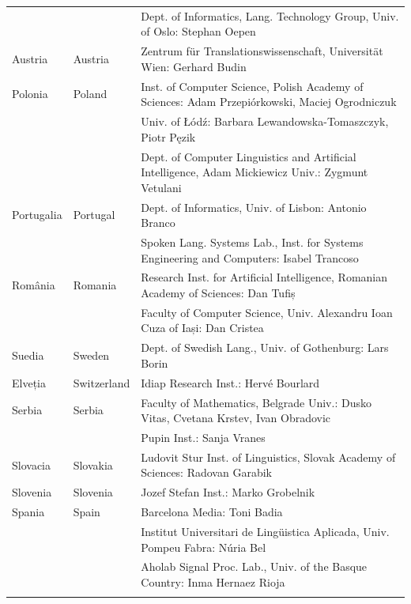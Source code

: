 \documentclass[]{../../metanetpaper}
\begin{document}
\begin{longtable}{llp{105mm}}
  & & Dept. of Informatics, Lang. Technology Group, Univ. of Oslo: Stephan Oepen \\ \addlinespace
  Austria & \textcolor{grey1}{Austria} & Zentrum für Translationswissenschaft, Universität Wien: Gerhard Budin\\ \addlinespace 
  Polonia & \textcolor{grey1}{Poland} & Inst. of Computer Science, Polish Academy of Sciences: Adam Przepiórkowski, Maciej Ogrodniczuk \\ \addlinespace
  & & Univ. of Łódź: Barbara Lewandowska-Tomaszczyk, Piotr Pęzik\\ \addlinespace
  & & Dept. of Computer Linguistics and Artificial Intelligence, Adam Mickiewicz Univ.: Zygmunt Vetulani \\ \addlinespace
  Portugalia & \textcolor{grey1}{Portugal} & Dept. of Informatics, Univ. of Lisbon: Antonio Branco\\ \addlinespace
  & & Spoken Lang. Systems Lab., Inst. for Systems Engineering and Computers: Isabel Trancoso \\ \addlinespace
  România & \textcolor{grey1}{Romania} & Research Inst. for Artificial Intelligence, Romanian Academy of Sciences: Dan Tufiș \\ \addlinespace
  & & Faculty of Computer Science, Univ. Alexandru Ioan Cuza of Iași: Dan Cristea \\ \addlinespace
  Suedia & \textcolor{grey1}{Sweden} & Dept. of Swedish Lang., Univ. of Gothenburg: Lars Borin \\ \addlinespace 
  Elveția & \textcolor{grey1}{Switzerland} & Idiap Research Inst.: Hervé Bourlard \\ \addlinespace 
  Serbia & \textcolor{grey1}{Serbia} & Faculty of Mathematics, Belgrade Univ.: Dusko Vitas, Cvetana Krstev, Ivan Obradovic \\ \addlinespace
  & & Pupin Inst.: Sanja Vranes \\ \addlinespace  
  Slovacia & \textcolor{grey1}{Slovakia} & Ludovit Stur Inst. of Linguistics, Slovak Academy of Sciences: Radovan Garabik \\ \addlinespace 
  Slovenia & \textcolor{grey1}{Slovenia} & Jozef Stefan Inst.: Marko Grobelnik \\ \addlinespace 
  Spania & \textcolor{grey1}{Spain} & Barcelona Media: Toni Badia \\ \addlinespace 
  & & Institut Universitari de Lingüistica Aplicada, Univ. Pompeu Fabra: Núria Bel \\ \addlinespace 
  & & Aholab Signal Proc. Lab., Univ. of the Basque Country: Inma Hernaez Rioja \\ \addlinespace 

\end{longtable}
\end{document}
